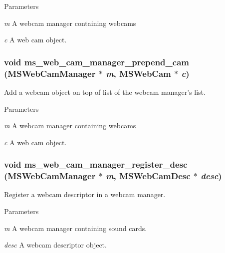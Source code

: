 \begin{DoxyParams}{Parameters}
\item[{\em m}]A webcam manager containing webcams \item[{\em c}]A web cam object. \end{DoxyParams}
\subsubsection[{ms\_\-web\_\-cam\_\-manager\_\-prepend\_\-cam}]{\setlength{\rightskip}{0pt plus 5cm}void ms\_\-web\_\-cam\_\-manager\_\-prepend\_\-cam ({\bf MSWebCamManager} $\ast$ {\em m}, \/  {\bf MSWebCam} $\ast$ {\em c})}\label{group__mediastreamer2__webcam_ga4537fe9312fe9a647a724d48a7f54a7a}
Add a webcam object on top of list of the webcam manager's list.


\begin{DoxyParams}{Parameters}
\item[{\em m}]A webcam manager containing webcams \item[{\em c}]A web cam object. \end{DoxyParams}
\subsubsection[{ms\_\-web\_\-cam\_\-manager\_\-register\_\-desc}]{\setlength{\rightskip}{0pt plus 5cm}void ms\_\-web\_\-cam\_\-manager\_\-register\_\-desc ({\bf MSWebCamManager} $\ast$ {\em m}, \/  {\bf MSWebCamDesc} $\ast$ {\em desc})}\label{group__mediastreamer2__webcam_gad9dc399856a42d88bce8131621d8e624}
Register a webcam descriptor in a webcam manager.


\begin{DoxyParams}{Parameters}
\item[{\em m}]A webcam manager containing sound cards. \item[{\em desc}]A webcam descriptor object. \end{DoxyParams}

